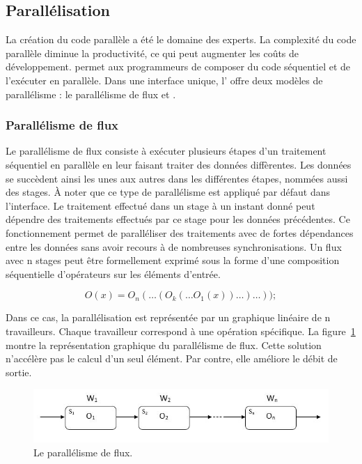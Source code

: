\subsection{Parall\'elisation}

La cr\'eation du code parall\`ele a \'et\'e le domaine des experts. La complexit\'e du code parall\`ele diminue la productivit\'e, ce qui peut augmenter les co\^uts de d\'eveloppement.  permet aux programmeurs de composer du code s\'equentiel et de l'ex\'ecuter en parall\`ele. Dans une interface unique, l' offre deux mod\`eles de parall\'elisme : le parall\'elisme de flux et .


\subsubsection{Parall\'elisme de flux}

Le parall\'elisme de flux consiste \`a ex\'ecuter plusieurs \'etapes d'un traitement s\'equentiel en parall\`ele en leur faisant traiter des données diff\`erentes. Les donn\'ees se succ\`edent ainsi les unes aux autres dans les diff\'erentes \'etapes, nomm\'ees aussi des stages. \`A noter que ce type de parall\'elisme est appliqu\'e par d\'efaut dans l'interface. Le traitement effectu\'e dans un stage \`a un instant donn\'e peut d\'ependre des traitements effectu\'es par ce stage pour les donn\'ees pr\'ec\'edentes. Ce fonctionnement permet de parall\'eliser des traitements avec de fortes d\'ependances entre les donn\'ees sans avoir recours \`a de nombreuses synchronisations. 
Un flux avec n stages peut \^etre formellement exprim\'e sous la forme d'une composition s\'equentielle d'op\'erateurs sur les \'el\'ements d'entr\'ee. 

\[
	O(x) = O_n( \ldots (O_k( \ldots O_1(x)) \ldots ) \ldots ));
\]

Dans ce cas, la parall\'elisation est repr\'esent\'ee par un graphique lin\'eaire de n travailleurs. Chaque travailleur correspond \`a une op\'eration sp\'ecifique. La figure~\ref{ParallelismeDuFlux.fig} montre la repr\'esentation graphique du parall\'elisme de flux. Cette solution n'acc\'el\`ere pas le calcul d'un seul \'el\'ement. Par contre, elle am\'eliore le d\'ebit de sortie.

\begin{figure}[ht]
\centering
     \includegraphics[width=1.0\textwidth]{Figures/ParallelismeDuFlux.jpg}
      \caption{Le parall\'elisme de flux.}
       \label{ParallelismeDuFlux.fig}
\end{figure}


